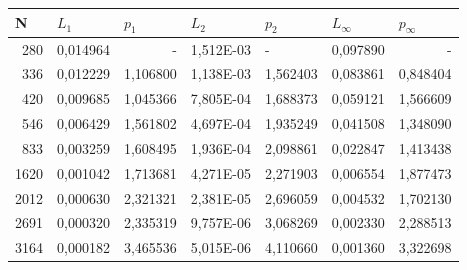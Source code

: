 \documentclass[14pt]{article}
\begin{document}
\begin{table}[h]
\begin{tabular}{|r|r|r|r|r|r|r|}
\hline
\multicolumn{1}{|l|}{N} & \multicolumn{1}{l|}{$L_1$}        & \multicolumn{1}{l|}{$p_1$} & \multicolumn{1}{l|}{$L_2$}     & \multicolumn{1}{l|}{$p_2$} & \multicolumn{1}{l|}{$L_\infty$} & \multicolumn{1}{l|}{$p_\infty$} \\ \hline
280                         & 0,014964                      & -                         & 1,512E-03                      & \multicolumn{1}{l|}{-}    & 0,097890                      & -                           \\ \hline
336                         & 0,012229                      & 1,106800                  & 1,138E-03                      & 1,562403                  & 0,083861                      & 0,848404                    \\ \hline
420                         & 0,009685                      & 1,045366                  & 7,805E-04                      & 1,688373                  & 0,059121                      & 1,566609                    \\ \hline
546                         & 0,006429                      & 1,561802                  & 4,697E-04                      & 1,935249                  & 0,041508                      & 1,348090                    \\ \hline
833                         & 0,003259                      & 1,608495                  & 1,936E-04                      & 2,098861                  & 0,022847                      & 1,413438                    \\ \hline
1620                        & 0,001042                      & 1,713681                  & 4,271E-05                      & 2,271903                  & 0,006554                      & 1,877473                    \\ \hline
2012                        & 0,000630                      & 2,321321                  & 2,381E-05                      & 2,696059                  & 0,004532                      & 1,702130                    \\ \hline
2691                        & 0,000320                      & 2,335319                  & 9,757E-06                      & 3,068269                  & 0,002330                      & 2,288513                    \\ \hline
3164                        & 0,000182                      & 3,465536                  & 5,015E-06                      & 4,110660                  & 0,001360                      & 3,322698                    \\ \hline

\end{tabular}
\end{table}
\end{document}
